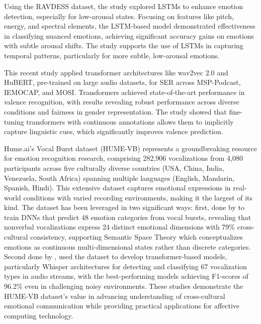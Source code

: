 \par Using the RAVDESS dataset, the study \cite{jalal2019spatio} explored LSTMs to enhance emotion detection, especially for low-arousal states. Focusing on features like pitch, energy, and spectral elements, the LSTM-based model demonstrated effectiveness in classifying nuanced emotions, achieving significant accuracy gains on emotions with subtle arousal shifts. The study supports the use of LSTMs in capturing temporal patterns, particularly for more subtle, low-arousal emotions.

\par This recent study \cite{wagner2023dawn} applied transformer architectures like wav2vec 2.0 and HuBERT, pre-trained on large audio datasets, for SER across MSP-Podcast, IEMOCAP, and MOSI. Transformers achieved state-of-the-art performance in valence recognition, with results revealing robust performance across diverse conditions and fairness in gender representation. The study showed that fine-tuning transformers with continuous annotations allows them to implicitly capture linguistic cues, which significantly improves valence prediction. 

\par Hume.ai's Vocal Burst dataset (HUME-VB) represents a groundbreaking resource for emotion recognition research, comprising 282,906 vocalizations from 4,080 participants across five culturally diverse countries (USA, China, India, Venezuela, South Africa) spanning multiple languages (English, Mandarin, Spanish, Hindi). This extensive dataset captures emotional expressions in real-world conditions with varied recording environments, making it the largest of its kind. The dataset has been leveraged in two significant ways: first, done by \cite{brooks2023vocalburst_deep} to train DNNs that predict 48 emotion categories from vocal bursts, revealing that nonverbal vocalizations express 24 distinct emotional dimensions with 79\% cross-cultural consistency, supporting Semantic Space Theory which conceptualizes emotions as continuous multi-dimensional states rather than discrete categories. Second done by \cite{tzirakis2023large_vocalburst}, used the dataset to develop transformer-based models, particularly Whisper architectures for detecting and classifying 67 vocalization types in audio streams, with the best-performing models achieving F1-scores of 96.2\% even in challenging noisy environments. These studies demonstrate the HUME-VB dataset's value in advancing understanding of cross-cultural emotional communication while providing practical applications for affective computing technology.

